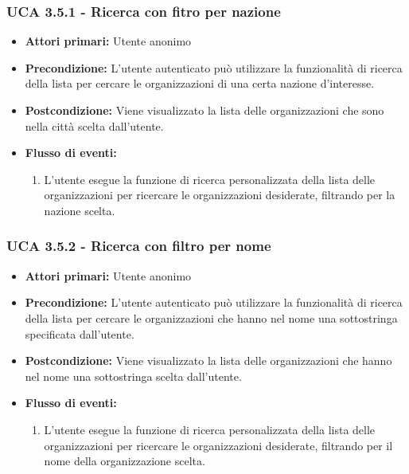 \subsubsection{UCA 3.5.1 - Ricerca con fitro per nazione}%
\begin{itemize}
	\item \textbf{Attori primari:} Utente anonimo
	\item \textbf{Precondizione:} L'utente autenticato può utilizzare la funzionalità di ricerca della lista per cercare le organizzazioni di una certa nazione d'interesse.
	\item \textbf{Postcondizione:} Viene visualizzato la lista delle organizzazioni che sono nella città scelta dall'utente.
	\item \textbf{Flusso di eventi:}
	\begin{enumerate}
		\item L'utente esegue la funzione di ricerca personalizzata della lista delle organizzazioni per ricercare le organizzazioni desiderate, filtrando per la nazione scelta.
	\end{enumerate}
\end{itemize}

\subsubsection{UCA 3.5.2 - Ricerca con filtro per nome}%
\begin{itemize}
	\item \textbf{Attori primari:} Utente anonimo
	\item \textbf{Precondizione:} L'utente autenticato può utilizzare la funzionalità di ricerca della lista per cercare le organizzazioni che hanno nel nome una sottostringa specificata dall'utente.
	\item \textbf{Postcondizione:} Viene visualizzato la lista delle organizzazioni che hanno nel nome una sottostringa scelta dall'utente.
	\item \textbf{Flusso di eventi:}
	\begin{enumerate}
		\item L'utente esegue la funzione di ricerca personalizzata della lista delle organizzazioni per ricercare le organizzazioni desiderate, filtrando per il nome della organizzazione scelta.
	\end{enumerate}
\end{itemize}

